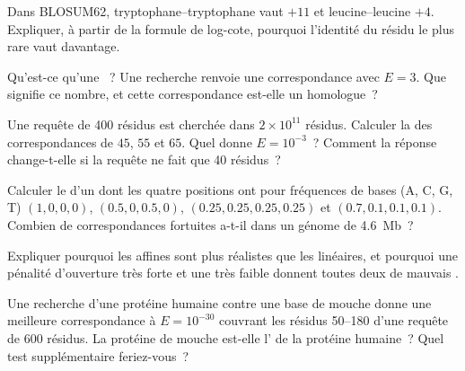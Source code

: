 \begin{exercise}[$\star$]\label{exo:b3:bioinformatics:3}
Dans BLOSUM62, tryptophane--tryptophane vaut $+11$ et
leucine--leucine $+4$. Expliquer, à partir de la formule de log-cote,
pourquoi l'identité du résidu le plus rare vaut davantage.
\end{exercise}

\begin{exercise}[$\star$]\label{exo:b3:bioinformatics:4}
Qu'est-ce qu'une ~? Une recherche renvoie une correspondance
avec $E = 3$. Que signifie ce nombre, et cette correspondance est-elle
un homologue~?
\end{exercise}

\begin{exercise}[$\star\star$]\label{exo:b3:bioinformatics:5}
Une requête de \num{400} résidus est cherchée dans $2\times 10^{11}$
résidus. Calculer la  des correspondances de 
$45$, $55$ et $65$. Quel  donne $E = 10^{-3}$~? Comment la
réponse change-t-elle si la requête ne fait que \num{40} résidus~?
\end{exercise}

\begin{exercise}[$\star\star$]\label{exo:b3:bioinformatics:6}
Calculer le  d'un  dont les quatre positions
ont pour fréquences de bases (A, C, G, T) $(1,0,0,0)$,
$(0.5,0,0.5,0)$, $(0.25,0.25,0.25,0.25)$ et $(0.7,0.1,0.1,0.1)$.
Combien de correspondances fortuites a-t-il dans un génome de
\qty{4.6}{Mb}~?
\end{exercise}

\begin{exercise}[$\star\star$]\label{exo:b3:bioinformatics:7}
Expliquer pourquoi les  affines sont plus réalistes
que les linéaires, et pourquoi une pénalité d'ouverture très forte et
une très faible donnent toutes deux de mauvais .
\end{exercise}

\begin{exercise}[$\star\star$]\label{exo:b3:bioinformatics:8}
Une recherche  d'une protéine humaine contre une base de mouche
donne une meilleure correspondance à $E = 10^{-30}$ couvrant les
résidus 50--180 d'une requête de \num{600} résidus. La protéine de
mouche est-elle l' de la protéine humaine~? Quel test
supplémentaire feriez-vous~?
\end{exercise}

